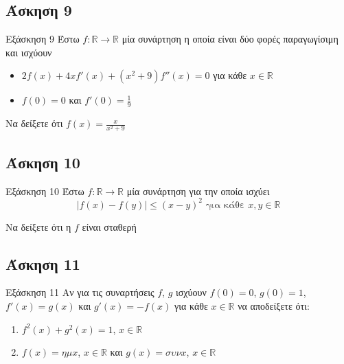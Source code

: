 \documentclass[greek]{beamer}
\begin{document}
\subsection{Άσκηση 9}
\begin{frame}[label=Άσκηση9]{Εξάσκηση 9}
 Έστω $f:\mathbb{R}\to\mathbb{R}$ μία συνάρτηση η οποία είναι δύο φορές παραγωγίσιμη και ισχύουν
 \begin{itemize}
  \item $2f(x)+4xf'(x)+(x^2+9)f''(x)=0$ για κάθε $x\in\mathbb{R}$
  \item $f(0)=0$ και $f'(0)=\frac{1}{9}$
 \end{itemize}

 Να δείξετε ότι $f(x)=\frac{x}{x^2+9}$

\end{frame}

\subsection{Άσκηση 10}
\begin{frame}[label=Άσκηση10]{Εξάσκηση 10}
 Έστω $f:\mathbb{R}\to\mathbb{R}$ μία συνάρτηση για την οποία ισχύει
 $$|f(x)-f(y)|\le (x-y)^2 \text{ για κάθε } x,y\in\mathbb{R}$$

 Να δείξετε ότι η $f$ είναι σταθερή

\end{frame}

\subsection{Άσκηση 11}
\begin{frame}[label=Άσκηση11]{Εξάσκηση 11}
 Αν για τις συναρτήσεις $f$, $g$ ισχύουν $f(0)=0$, $g(0)=1$, $f'(x)=g(x)$ και $g'(x)=-f(x)$ για κάθε $x\in\mathbb{R}$ να αποδείξετε ότι:
 \begin{enumerate}
  \item<1-> $f^2(x)+g^2(x)=1$, $x\in\mathbb{R}$
  \item<2-> $f(x)=ημx$, $x\in\mathbb{R}$ και $g(x)=συνx$, $x\in\mathbb{R}$
 \end{enumerate}

\end{frame}


\appendix
\end{document}
